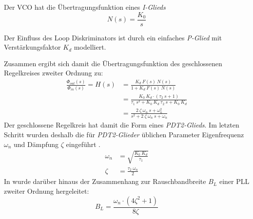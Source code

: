 
Der VCO hat die Übertragungsfunktion eines \emph{I-Glieds} \cite{gardner2005phaselock}
\begin{equation}
    N(s)=\frac{K_0}{s}
\end{equation}

Der Einfluss des Loop Diskriminators ist durch ein einfaches \emph{P-Glied} mit Verstärkungsfaktor $K_d$ modelliert.

Zusammen ergibt sich damit die Übertragungsfunktion des geschlossenen Regelkreises zweiter Ordnung zu:
\begin{align}
    \frac{\Phi_{out}(s)}{\Phi_{in}(s)}=H(s) &= \frac{K_d ~ F(s)~ N(s)}{1+K_d ~ F(s)~ N(s)}\\
         &= \frac{K_0 ~K_d \cdot (\tau_2 ~s + 1)}{\tau_1 ~s^2 + K_0 ~K_d~\tau_2~s+K_0~K_d}\\
         &= \frac{2  ~ \zeta  ~ \omega_n ~ s + \omega_n^2}{s^2 + 2 ~\zeta~\omega_n~s + \omega_n}
\end{align}
Der geschlossene Regelkreis hat damit die Form eines \emph{PDT2-Glieds}. Im letzten Schritt wurden deshalb die für \emph{PDT2-Glieder} üblichen Parameter Eigenfrequenz $\omega_n$ und Dämpfung $\zeta$ eingeführt \cite{gardner2005phaselock}.
\begin{align}
    \omega_n &=\sqrt{\frac{K_0~K_d}{\tau_1}} \label{Eq:omegaN}\\
    \zeta &=\frac{\tau_2~\omega_n}{2} \label{Eq:zeta}
\end{align}
In \cite{parkinsonGPS} wurde darüber hinaus der Zusammenhang zur Rauschbandbreite $B_L$ einer PLL zweiter Ordnung hergeleitet:
\begin{equation}
    B_L = \frac{\omega_n \cdot (4\zeta^2+1)}{8\zeta} \label{Eq:NoiseBW}
\end{equation}


